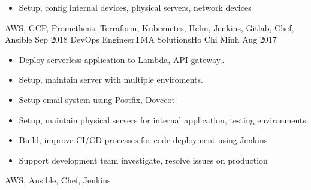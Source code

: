\begin{experiences}
{\begin{itemize}
                        \item Setup, config internal devices, physical servers, network devices
                      \end{itemize}
                    }
                    {AWS, GCP, Prometheus, Terraform, Kubernetes, Helm, Jenkins, Gitlab, Chef, Ansible}
  \emptySeparator
  \experience
    {Sep 2018} {DevOps Engineer}{TMA Solutions}{Ho Chi Minh}
    {Aug 2017}    {
                      \begin{itemize}
                        \item Deploy serverless application to Lambda, API gateway..
                        \item Setup, maintain server with multiple enviroments.
                        \item Setup email system using Postfix, Dovecot
                        \item Setup, maintain physical servers for internal application, testing environments
                        \item Build, improve CI/CD processes for code deployment using Jenkins
                        \item Support development team investigate, resolve issues on production
                      \end{itemize}
                    }
                    {AWS, Ansible, Chef, Jenkins}
  \emptySeparator
\end{experiences}